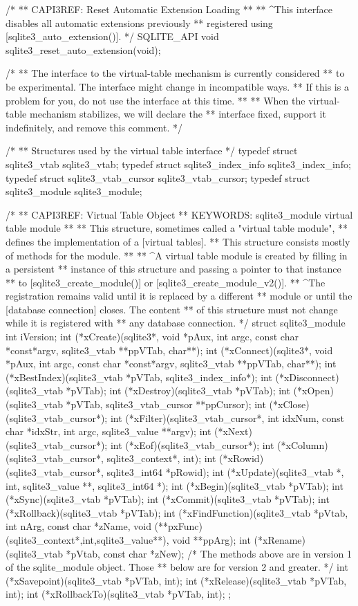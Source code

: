 \begin{Codex}[label=sqlite3.h,numbers=left]
{/*
** CAPI3REF: Reset Automatic Extension Loading
**
** ^This interface disables all automatic extensions previously
** registered using [sqlite3_auto_extension()].
*/
SQLITE_API void sqlite3_reset_auto_extension(void);

/*
** The interface to the virtual-table mechanism is currently considered
** to be experimental.  The interface might change in incompatible ways.
** If this is a problem for you, do not use the interface at this time.
**
** When the virtual-table mechanism stabilizes, we will declare the
** interface fixed, support it indefinitely, and remove this comment.
*/

/*
** Structures used by the virtual table interface
*/
typedef struct sqlite3_vtab sqlite3_vtab;
typedef struct sqlite3_index_info sqlite3_index_info;
typedef struct sqlite3_vtab_cursor sqlite3_vtab_cursor;
typedef struct sqlite3_module sqlite3_module;

/*
** CAPI3REF: Virtual Table Object
** KEYWORDS: sqlite3_module {virtual table module}
**
** This structure, sometimes called a "virtual table module", 
** defines the implementation of a [virtual tables].  
** This structure consists mostly of methods for the module.
**
** ^A virtual table module is created by filling in a persistent
** instance of this structure and passing a pointer to that instance
** to [sqlite3_create_module()] or [sqlite3_create_module_v2()].
** ^The registration remains valid until it is replaced by a different
** module or until the [database connection] closes.  The content
** of this structure must not change while it is registered with
** any database connection.
*/
struct sqlite3_module {
  int iVersion;
  int (*xCreate)(sqlite3*, void *pAux,
               int argc, const char *const*argv,
               sqlite3_vtab **ppVTab, char**);
  int (*xConnect)(sqlite3*, void *pAux,
               int argc, const char *const*argv,
               sqlite3_vtab **ppVTab, char**);
  int (*xBestIndex)(sqlite3_vtab *pVTab, sqlite3_index_info*);
  int (*xDisconnect)(sqlite3_vtab *pVTab);
  int (*xDestroy)(sqlite3_vtab *pVTab);
  int (*xOpen)(sqlite3_vtab *pVTab, sqlite3_vtab_cursor **ppCursor);
  int (*xClose)(sqlite3_vtab_cursor*);
  int (*xFilter)(sqlite3_vtab_cursor*, int idxNum, const char *idxStr,
                int argc, sqlite3_value **argv);
  int (*xNext)(sqlite3_vtab_cursor*);
  int (*xEof)(sqlite3_vtab_cursor*);
  int (*xColumn)(sqlite3_vtab_cursor*, sqlite3_context*, int);
  int (*xRowid)(sqlite3_vtab_cursor*, sqlite3_int64 *pRowid);
  int (*xUpdate)(sqlite3_vtab *, int, sqlite3_value **, sqlite3_int64 *);
  int (*xBegin)(sqlite3_vtab *pVTab);
  int (*xSync)(sqlite3_vtab *pVTab);
  int (*xCommit)(sqlite3_vtab *pVTab);
  int (*xRollback)(sqlite3_vtab *pVTab);
  int (*xFindFunction)(sqlite3_vtab *pVtab, int nArg, const char *zName,
                       void (**pxFunc)(sqlite3_context*,int,sqlite3_value**),
                       void **ppArg);
  int (*xRename)(sqlite3_vtab *pVtab, const char *zNew);
  /* The methods above are in version 1 of the sqlite_module object. Those 
  ** below are for version 2 and greater. */
  int (*xSavepoint)(sqlite3_vtab *pVTab, int);
  int (*xRelease)(sqlite3_vtab *pVTab, int);
  int (*xRollbackTo)(sqlite3_vtab *pVTab, int);
};

}
\end{Codex}

